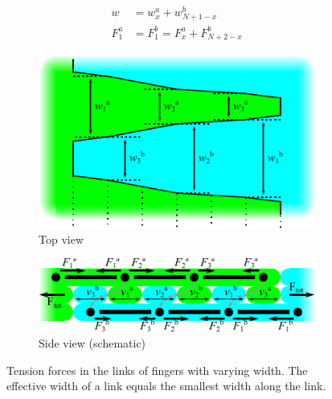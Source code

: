 \begin{align}
	w &= w_x^a + w_{N+1-x}^b \label{eq:width_formula} \\
	F_1^a &= F_1^b = F_x^a + F_{N+2-x}^b  \label{eq:forces_formula}
\end{align}

\begin{figure}
	\centering
	\begin{subfigure}{\columnwidth}
		\includegraphics[width=\columnwidth]{sources/method/varying_width_fingers.pdf}
		\caption{Top view}
	\end{subfigure}
	\begin{subfigure}{\columnwidth}
		\includegraphics[width=\columnwidth]{sources/method/stress_distribution.pdf}
		\caption{Side view (schematic)}
	\end{subfigure}
	\caption{Tension forces in the links of fingers with varying width. The effective width of a link equals the smallest width along the link.}
	\label{fig:force_distribution}
\end{figure}


